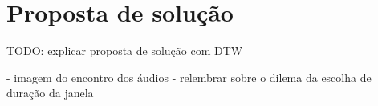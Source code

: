 \section{Proposta de solução}


TODO: explicar proposta de solução com DTW

- imagem do encontro dos áudios
- relembrar sobre o dilema da escolha de duração da janela